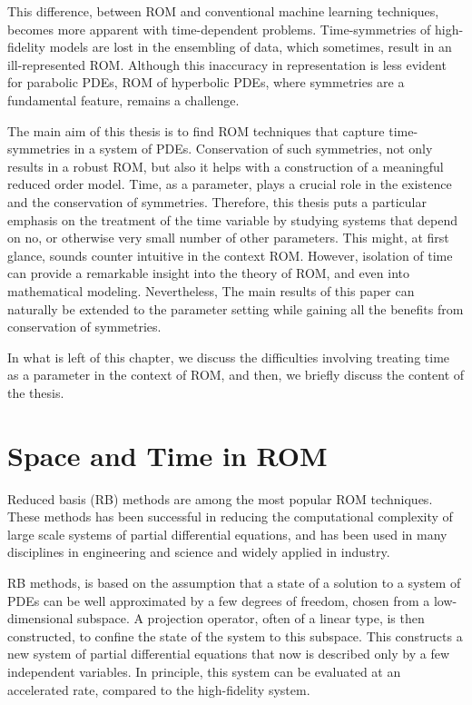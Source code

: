This difference, between ROM and conventional machine learning techniques, becomes more apparent with time-dependent problems. Time-symmetries of high-fidelity models are lost in the ensembling of data, which sometimes, result in an ill-represented ROM. Although this inaccuracy in representation is less evident for parabolic PDEs, ROM of hyperbolic PDEs, where symmetries are a fundamental feature, remains a challenge.

The main aim of this thesis is to find ROM techniques that capture time-symmetries in a system of PDEs. Conservation of such symmetries, not only results in a robust ROM, but also it helps with a construction of a meaningful reduced order model. Time, as a parameter, plays a crucial role in the existence and the conservation of symmetries. Therefore, this thesis puts a particular emphasis on the treatment of the time variable by studying systems that depend on no, or otherwise very small number of other parameters. This might, at first glance, sounds counter intuitive in the context ROM. However, isolation of time can provide a remarkable insight into the theory of ROM, and even into mathematical modeling. Nevertheless, The main results of this paper can naturally be extended to the parameter setting while gaining all the benefits from conservation of symmetries.

In what is left of this chapter, we discuss the difficulties involving treating time as a parameter in the context of ROM, and then, we briefly discuss the content of the thesis.

\section*{Space and Time in ROM}
Reduced basis (RB) methods are among the most popular ROM techniques. These methods has been successful in reducing the computational complexity of large scale systems of partial differential equations, and has been used in many disciplines in engineering and science and widely applied in industry. 

RB methods, is based on the assumption that a state of a solution to a system of PDEs can be well approximated by a few degrees of freedom, chosen from a low-dimensional subspace. A projection operator, often of a linear type, is then constructed, to confine the state of the system to this subspace. This constructs a new system of partial differential equations that now is described only by a few independent variables. In principle, this system can be evaluated at an accelerated rate, compared to the high-fidelity system.


